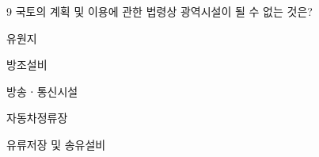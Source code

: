 \begin{question}{9}
국토의 계획 및 이용에 관한 법령상 광역시설이 될 수 없는 것은?
\begin{choices}
  \item 유원지
  \item 방조설비
  \item 방송ㆍ통신시설
  \item 자동차정류장
  \item 유류저장 및 송유설비
\end{choices}
\end{question}
